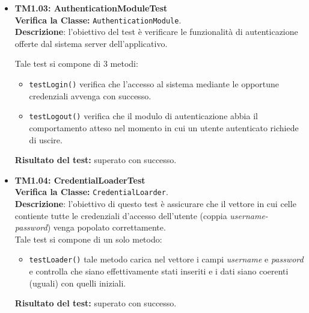 \begin{itemize}
\begin{table}
\end{table}

\item \textbf{TM1.03: AuthenticationModuleTest}\\
\textbf{Verifica la Classe:} \texttt{AuthenticationModule}.\\
\textbf{Descrizione}: l'obiettivo del test è verificare le funzionalità di autenticazione offerte dal sistema server dell'applicativo.

Tale test si compone di 3 metodi:
\begin{itemize}
\item \texttt{testLogin()} verifica che l'accesso al sistema mediante le opportune credenziali avvenga con successo.
\item \texttt{testLogout()} verifica che il modulo di autenticazione abbia il comportamento atteso nel momento in cui un utente autenticato richiede di uscire.
\end{itemize}
\textbf{Risultato del test:} superato con successo.

\begin{table}
\end{table}

\item \textbf{TM1.04: CredentialLoaderTest}\\
\textbf{Verifica la Classe:} \texttt{CredentialLoarder}.\\
\textbf{Descrizione}: l'obiettivo di questo test è assicurare che il vettore in cui celle contiente tutte le credenziali d'accesso dell'utente (coppia \textit{username-password}) venga popolato correttamente.\\
Tale test si compone di un solo metodo:
\begin{itemize}
\item \texttt{testLoader()} tale metodo carica nel vettore i campi \textit{username} e \textit{password} e controlla che siano effettivamente stati inseriti e i dati siano coerenti (uguali) con quelli iniziali.
\end{itemize}
\textbf{Risultato del test:} superato con successo.


\end{itemize}
